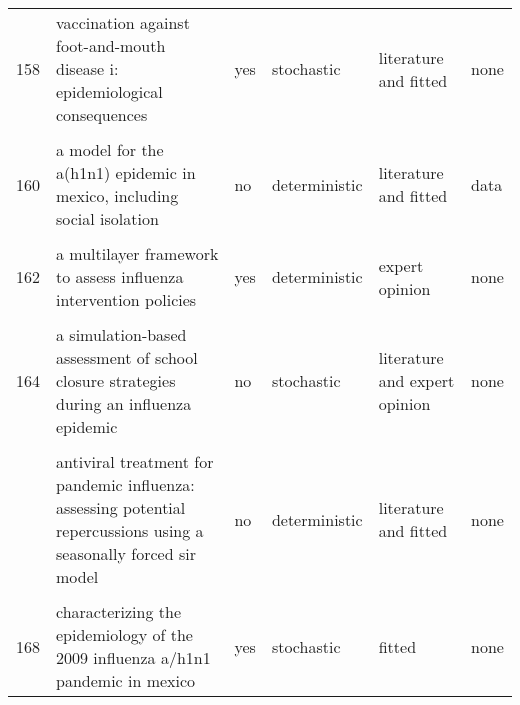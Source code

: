 \documentclass[
]{article}
\begin{document}
\begin{landscape}
\begin{longtable}{l>{\raggedright\arraybackslash}p{3cm}l>{\raggedright\arraybackslash}p{3cm}ll}
158 & vaccination against foot-and-mouth disease i: epidemiological consequences & yes & stochastic & literature and fitted & none\\
\cellcolor{gray!6}{159} & \cellcolor{gray!6}{a deterministic resource scheduling model in epidemic control: a case study} & \cellcolor{gray!6}{no} & \cellcolor{gray!6}{deterministic} & \cellcolor{gray!6}{literature} & \cellcolor{gray!6}{none}\\
160 & a model for the a(h1n1) epidemic in mexico, including social isolation & no & deterministic & literature and fitted & data\\
\addlinespace
\cellcolor{gray!6}{161} & \cellcolor{gray!6}{a model to evaluate mass vaccination against pneumococcus as a countermeasure against pandemic influenza} & \cellcolor{gray!6}{no} & \cellcolor{gray!6}{deterministic} & \cellcolor{gray!6}{fitted} & \cellcolor{gray!6}{none}\\
162 & a multilayer framework to assess influenza intervention policies & yes & deterministic & expert opinion & none\\
\cellcolor{gray!6}{163} & \cellcolor{gray!6}{a note on the use of optimal control on a discrete time model of influenza dynamics} & \cellcolor{gray!6}{no} & \cellcolor{gray!6}{deterministic} & \cellcolor{gray!6}{expert opinion} & \cellcolor{gray!6}{none}\\
164 & a simulation-based assessment of school closure strategies during an influenza epidemic & no & stochastic & literature and expert opinion & none\\
\cellcolor{gray!6}{165} & \cellcolor{gray!6}{agent-based modeling of the spread of influenza-like illness in an emergency department: a simulation study} & \cellcolor{gray!6}{yes} & \cellcolor{gray!6}{stochastic} & \cellcolor{gray!6}{literature and expert opinion} & \cellcolor{gray!6}{none}\\
\addlinespace
166 & antiviral treatment for pandemic influenza: assessing potential repercussions using a seasonally forced sir model & no & deterministic & literature and fitted & none\\
\cellcolor{gray!6}{167} & \cellcolor{gray!6}{can antiviral drugs contain pandemic influenza transmission?} & \cellcolor{gray!6}{no} & \cellcolor{gray!6}{deterministic} & \cellcolor{gray!6}{literature and expert opinion} & \cellcolor{gray!6}{none}\\
168 & characterizing the epidemiology of the 2009 influenza a/h1n1 pandemic in mexico & yes & stochastic & fitted & none\\

\end{longtable}
\end{landscape}
\end{document}
